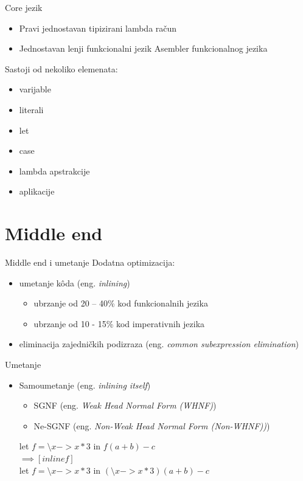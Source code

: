 \documentclass{beamer}
\begin{document}
\begin{frame}{Core jezik}
		
	\begin{itemize}
		\item Pravi jednostavan tipizirani lambda račun
		\item Jednostavan lenji funkcionalni jezik Asembler funkcionalnog jezika
	\end{itemize}
	
	Sastoji od nekoliko elemenata:
	\begin{itemize}
		\item varijable
		\item literali
		\item let
		\item case
		\item lambda apstrakcije
		\item aplikacije
	\end{itemize}
\end{frame}

\section{Middle end}

\begin{frame}{Middle end i umetanje}
	Dodatna optimizacija:
	\begin{itemize}
		\item  umetanje k\^{o}da (eng. \emph{inlining})
			\begin{itemize}
				\item ubrzanje  od 20 – 40\% kod funkcionalnih jezika
				\item ubrzanje od  10 - 15\% kod imperativnih jezika
			\end{itemize}
		\item  eliminacija zajedničkih podizraza (eng. \emph{common subexpression elimination})
	\end{itemize}
\end{frame}

\begin{frame}[fragile]{Umetanje}

	\begin{itemize}
		\item  Samoumetanje (eng. \emph{inlining itself})
			\begin{itemize}
				\item SGNF (eng. \emph{Weak Head Normal Form (WHNF)})
				\item Ne-SGNF (eng. \emph{Non-Weak Head Normal Form (Non-WHNF))})
			\end{itemize}
		\begin{block}{}
			let $  f = \setminus x -> x*3  $ in $  f (a + b) - c $
			\\$ \implies [inline f] $
			\\let $  f = \setminus x -> x*3  $ in $ (\setminus x -> x*3) (a + b) - c $
		\end{block}
	\end{itemize}
\end{frame}
\end{document}
